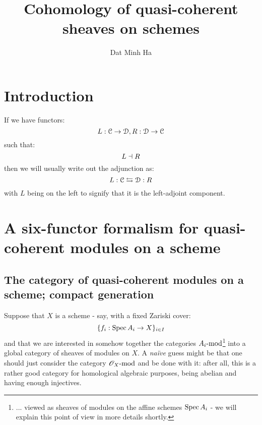 

\setcounter{section}{-1}





    \title{Cohomology of quasi-coherent sheaves on schemes}
    
    \author{Dat Minh Ha}
    \maketitle
    
    \begin{abstract}
        
    \end{abstract}
    
    {
      \hypersetup{} 
      \tableofcontents %
    }

    \section{Introduction}
        \begin{convention}
            If we have functors:
                $$L: \C \to \D, R: \D \to \C$$
            such that:
                $$L \ladjoint R$$
            then we will usually write out the adjunction as:
                $$L: \C \leftrightarrows \D: R$$
            with $L$ being on the left to signify that it is the left-adjoint component. 
        \end{convention}

    \section{A six-functor formalism for quasi-coherent modules on a scheme}
        \subsection{The category of quasi-coherent modules on a scheme; compact generation}
            Suppose that $X$ is a scheme - say, with a fixed Zariski cover:
                $$\{ f_i: \Spec A_i \to X \}_{i \in I}$$
            and that we are interested in somehow  together the categories $A_i\mod$\footnote{... viewed as sheaves of modules on the affine schemes $\Spec A_i$ - we will explain this point of view in more details shortly.} into a global category of sheaves of modules on $X$. A \textit{na\"ive} guess might be that one should just consider the category $\scrO_X\mod$ and be done with it: after all, this is a rather good category for homological algebraic purposes, being abelian and having enough injectives.
            
